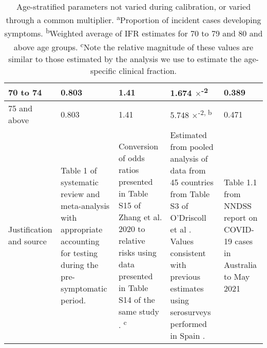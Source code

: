 \begin{table}[h]
\begin{tabular}[h]{| p{2cm} | p{2.5cm} | p{3cm} | p{3cm} | p{2.5cm}|}
        \hline
        70 to 74 & 0.803 & 1.41 & 1.674 $\times$\textsuperscript{-2} & 0.389 \\
        \hline
        75 and above & 0.803 & 1.41 & 5.748 $\times$\textsuperscript{-2, b} & 0.471 \\
        \hline
        Justification and source & 
        Table 1 of systematic review and meta-analysis with appropriate accounting for testing during the pre-symptomatic period. & 
        Conversion of odds ratios presented in Table S15 of Zhang et al. 2020 to relative risks using data presented in Table S14 of the same study \cite{RN7}. \textsuperscript{c} &
        Estimated from pooled analysis of data from 45 countries from Table S3 of O'Driscoll et al \cite{odriscoll-2021}. 
        Values consistent with previous estimates using serosurveys performed in Spain \cite{RN21}. &
        Table 1.1 from NNDSS report on COVID-19 cases in Australia to May 2021 \\ 
        \hline
	\end{tabular}
	\caption[Age-stratified parameters not varied during calibration, or varied through a common multiplier.]
    {Age-stratified parameters not varied during calibration, or varied through a common multiplier. 
    \textsuperscript{a}Proportion of incident cases developing symptoms. 
    \textsuperscript{b}Weighted average of IFR estimates for 70 to 79 and 80 and above age groups. 
    \textsuperscript{c}Note the relative magnitude of these values are similar to those estimated by the analysis we use to estimate the age-specific clinical fraction.}
	\label{tab:age_params}
\end{table}

\clearpage